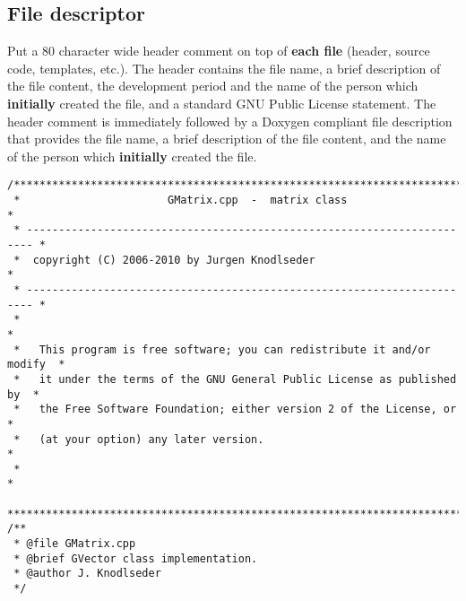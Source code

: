 \documentclass{article}[12pt,a4]
\begin{document}
\subsection{File descriptor}

Put a 80 character wide header comment on top of {\bf each file}
(header, source code, templates, etc.).
The header contains
the file name,
a brief description of the file content,
the development period and the name of the person which {\bf initially}
created the file, and
a standard GNU Public License statement.
The header comment is immediately followed by a Doxygen compliant
file description that provides
the file name,
a brief description of the file content, and
the name of the person which {\bf initially} created the file.
\begin{verbatim}
/***************************************************************************
 *                       GMatrix.cpp  -  matrix class                      *
 * ----------------------------------------------------------------------- *
 *  copyright (C) 2006-2010 by Jurgen Knodlseder                           *
 * ----------------------------------------------------------------------- *
 *                                                                         *
 *   This program is free software; you can redistribute it and/or modify  *
 *   it under the terms of the GNU General Public License as published by  *
 *   the Free Software Foundation; either version 2 of the License, or     *
 *   (at your option) any later version.                                   *
 *                                                                         *
 ***************************************************************************/
/**
 * @file GMatrix.cpp
 * @brief GVector class implementation.
 * @author J. Knodlseder
 */
\end{verbatim}
\end{document}
